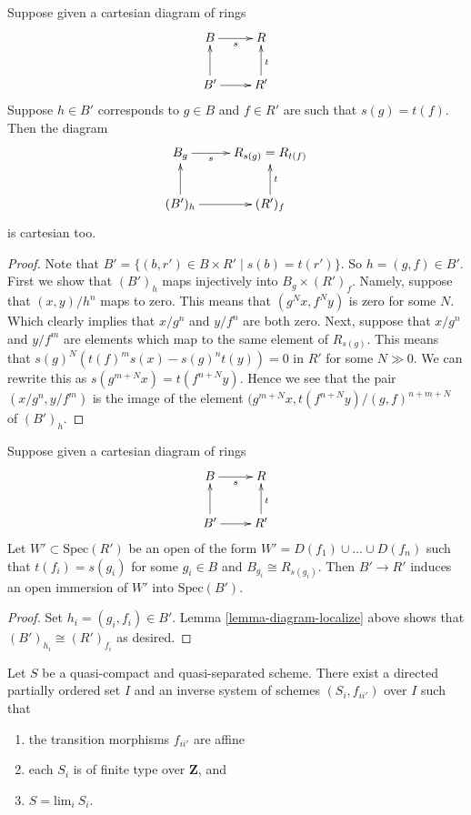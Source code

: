 \begin{lemma}
\label{lemma-diagram-localize}
Suppose given a cartesian diagram of rings
$$
\xymatrix{
B \ar[r]_s & R \\
B'\ar[u] \ar[r] & R' \ar[u]_{t}
}
$$
Suppose $h \in B'$ corresponds to $g \in B$
and $f \in R'$ are such that $s(g) = t(f)$.
Then the diagram
$$
\xymatrix{
B_g \ar[r]_-s & R_{s(g)} = R_{t(f)} \\
(B')_h \ar[u] \ar[r] & (R')_f \ar[u]_{t}
}
$$
is cartesian too.
\end{lemma}

\begin{proof}
Note that $B' = \{(b, r') \in B \times R' \mid s(b) = t(r')\}$.
So $h = (g, f) \in B'$. First we show that $(B')_h$ maps
injectively into $B_g \times (R')_f$. Namely, suppose that
$(x, y)/h^n$ maps to zero. This means that
$(g^Nx, f^Ny)$ is zero for some $N$. Which clearly implies
that $x/g^n$ and $y/f^n$ are both zero.
Next, suppose that $x/g^n$ and $y/f^m$ are elements
which map to the same element of $R_{s(g)}$.
This means that $s(g)^N(t(f)^ms(x) - s(g)^nt(y)) = 0$ in $R'$
for some $N \gg 0$. We can rewrite this as
$s(g^{m + N}x) = t(f^{n + N}y)$. Hence we see that the
pair $(x/g^n, y/f^m)$ is the image of the element
$(g^{m + N}x, t(f^{n + N}y)/(g, f)^{n + m + N}$ of
$(B')_h$.
\end{proof}

\begin{lemma}
\label{lemma-diagram}
Suppose given a cartesian diagram of rings
$$
\xymatrix{
B \ar[r]_s & R \\
B'\ar[u] \ar[r] & R' \ar[u]_{t}
}
$$
Let $W' \subset \text{Spec}(R')$ be an open of
the form $W' = D(f_1) \cup \ldots \cup D(f_n)$
such that $t(f_i) = s(g_i)$ for some $g_i \in B$
and $B_{g_i} \cong R_{s(g_i)}$. Then $B' \to R'$
induces an open immersion of $W'$ into $\text{Spec}(B')$.
\end{lemma}

\begin{proof}
Set $h_i = (g_i, f_i) \in B'$.
Lemma \ref{lemma-diagram-localize} above shows that
$(B')_{h_i} \cong (R')_{f_i}$ as desired.
\end{proof}

\begin{proposition}
\label{proposition-approximate}
Let $S$ be a quasi-compact and quasi-separated scheme.
There exist a directed partially ordered set $I$
and an inverse system of schemes $(S_i, f_{ii'})$ over $I$
such that
\begin{enumerate}
\item the transition morphisms $f_{ii'}$ are affine
\item each $S_i$ is of finite type over $\mathbf{Z}$, and
\item $S = \text{lim}_i\ S_i$.
\end{enumerate}
\end{proposition}

